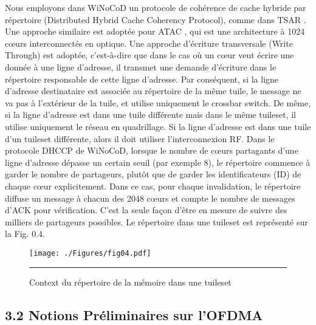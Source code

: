 Nous employons dans WiNoCoD un protocole de cohérence de cache hybride par répertoire (Distributed Hybrid Cache Coherency Protocol), comme dans TSAR \cite{greiner2009tsar}. Une approche similaire est adoptée pour ATAC \cite{kurian2010atac}, qui est une architecture à 1024 cœurs interconnectés en optique. Une approche d’écriture transversale (Write Through) est adoptée, c’est-à-dire que dans le cas où un cœur veut écrire une donnée à une ligne d'adresse, il transmet une demande d'écriture dans le répertoire responsable de cette ligne d'adresse. Par conséquent, si la ligne d'adresse destinataire est associée au répertoire de la même tuile, le message ne va pas à l'extérieur de la tuile, et utilise uniquement le crossbar switch. De même, si la ligne d'adresse est dans une tuile différente mais dans le même tuileset, il utilise uniquement le réseau en quadrillage. Si la ligne d'adresse est dans une tuile d'un tuileset différente, alors il doit utiliser l'interconnexion RF. Dans le protocole DHCCP de WiNoCoD, lorsque le nombre de cœurs partagants d'une ligne d'adresse dépasse un certain seuil (par exemple 8), le répertoire commence à garder le nombre de partageurs, plutôt que de garder les identificateurs (ID) de chaque cœur explicitement. Dans ce cas, pour chaque invalidation, le répertoire diffuse un message à chacun des 2048 cœurs et compte le nombre de messages d'ACK pour vérification. C’est la seule façon d'être en mesure de suivre des milliers de partageurs possibles. Le répertoire dans une tuileset est représenté sur la Fig. 0.4.

\begin{figure}[htbp]
  \centering
    \texttt{[image: ./Figures/fig04.pdf]}
    \rule{35em}{0.5pt}
  \caption[Contexte du répertoire de la mémoire dans une tuileset]{Context du répertoire de la mémoire dans une tuileset}
  \label{fig:Electron}
\end{figure}

\subsection*{3.2 Notions Préliminaires sur l’OFDMA}

